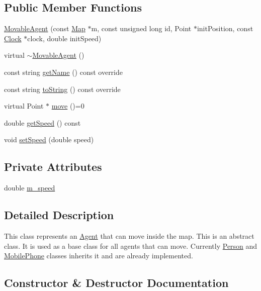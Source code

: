 \subsection*{Public Member Functions}
\begin{DoxyCompactItemize}
\item 
\hyperlink{class_movable_agent_ad76b14a044181a57ade71f1267a2ccbd}{Movable\+Agent} (const \hyperlink{class_map}{Map} $\ast$m, const unsigned long id, Point $\ast$init\+Position, const \hyperlink{class_clock}{Clock} $\ast$clock, double init\+Speed)
\item 
virtual \hyperlink{class_movable_agent_a20eb9ddcc953137e63e035837918206c}{$\sim$\+Movable\+Agent} ()
\item 
const string \hyperlink{class_movable_agent_abcc1218876c39c996f2cb1eba2b96379}{get\+Name} () const override
\item 
const string \hyperlink{class_movable_agent_a1dee2a6bf93f01006fadfb6fba6c9a59}{to\+String} () const override
\item 
virtual Point $\ast$ \hyperlink{class_movable_agent_a88b617f0e78c817634e5b587da045ab0}{move} ()=0
\item 
double \hyperlink{class_movable_agent_a12fcdaee60f5bb29f15fe113a7dacaac}{get\+Speed} () const
\item 
void \hyperlink{class_movable_agent_ae2ef452e81789a4370e7dee32a9cc67e}{set\+Speed} (double speed)
\end{DoxyCompactItemize}
\subsection*{Private Attributes}
\begin{DoxyCompactItemize}
\item 
double \hyperlink{class_movable_agent_ac725b42e7b968740a59c3e1033d69ac5}{m\+\_\+speed}
\end{DoxyCompactItemize}


\subsection{Detailed Description}
This class represents an \hyperlink{class_agent}{Agent} that can move inside the map. This is an abstract class. It is used as a base class for all agents that can move. Currently \hyperlink{class_person}{Person} and \hyperlink{class_mobile_phone}{Mobile\+Phone} classes inherits it and are already implemented. 

\subsection{Constructor \& Destructor Documentation}
\mbox{\label{class_movable_agent_ad76b14a044181a57ade71f1267a2ccbd}} 
